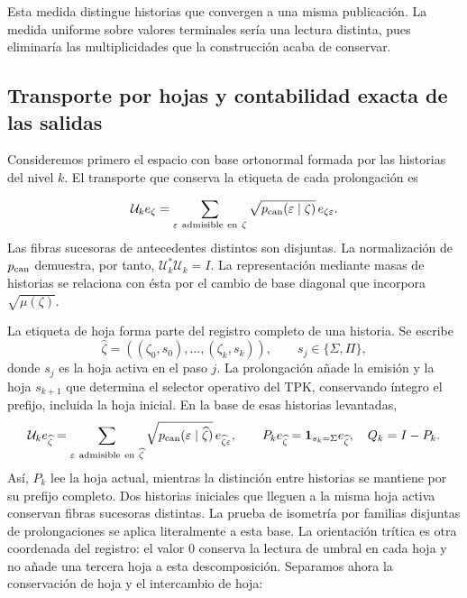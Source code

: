 Esta medida distingue historias que convergen a una misma publicación. La medida uniforme sobre valores terminales sería una lectura distinta, pues eliminaría las multiplicidades que la construcción acaba de conservar.



\subsection{Transporte por hojas y contabilidad exacta de las salidas}
Consideremos primero el espacio con base ortonormal formada por las historias del nivel \(k\). El transporte que conserva la etiqueta de cada prolongación es

\[
\mathcal U_ke_\zeta=
\sum_{\varepsilon\ \mathrm{admisible\ en}\ \zeta}
\sqrt{p_{\rm can}(\varepsilon\mid\zeta)}\,e_{\zeta\varepsilon}.
\]
Las fibras sucesoras de antecedentes distintos son disjuntas. La normalización de \(p_{\rm can}\) demuestra, por tanto, \(\mathcal U_k^*\mathcal U_k=I\). La representación mediante masas de historias se relaciona con ésta por el cambio de base diagonal que incorpora \(\sqrt{\mu(\zeta)}\).

La etiqueta de hoja forma parte del registro completo de una historia. Se escribe
\[
\widehat\zeta=((\zeta_0,s_0),\ldots,(\zeta_k,s_k)),\qquad
s_j\in\{\Sigma,\Pi\},
\]
donde \(s_j\) es la hoja activa en el paso \(j\). La prolongación añade la emisión y la hoja \(s_{k+1}\) que determina el selector operativo del TPK, conservando íntegro el prefijo, incluida la hoja inicial. En la base de esas historias levantadas,
\[
\mathcal U_ke_{\widehat\zeta}
=\sum_{\varepsilon\ \mathrm{admisible\ en}\ \widehat\zeta}
\sqrt{p_{\rm can}(\varepsilon\mid\widehat\zeta)}\,e_{\widehat\zeta\varepsilon},
\qquad
P_ke_{\widehat\zeta}=\mathbf1_{s_k=\Sigma}e_{\widehat\zeta},\quad
Q_k=I-P_k.
\]
Así, \(P_k\) lee la hoja actual, mientras la distinción entre historias se mantiene por su prefijo completo. Dos historias iniciales que lleguen a la misma hoja activa conservan fibras sucesoras distintas. La prueba de isometría por familias disjuntas de prolongaciones se aplica literalmente a esta base.
La orientación trítica es otra coordenada del registro: el valor \(0\) conserva la lectura de umbral en cada hoja y no añade una tercera hoja a esta descomposición. Separamos ahora la conservación de hoja y el intercambio de hoja:

